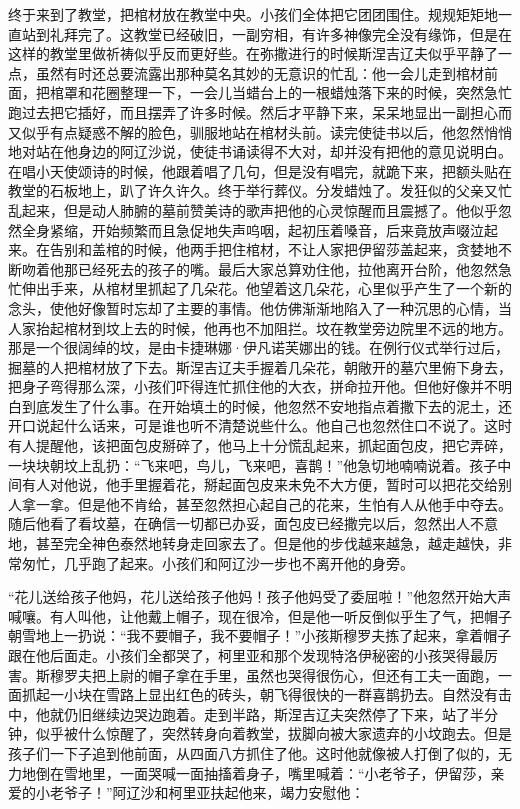 \par 终于来到了教堂，把棺材放在教堂中央。小孩们全体把它团团围住。规规矩矩地一直站到礼拜完了。这教堂已经破旧，一副穷相，有许多神像完全没有缘饰，但是在这样的教堂里做祈祷似乎反而更好些。在弥撒进行的时候斯涅吉辽夫似乎平静了一点，虽然有时还总要流露出那种莫名其妙的无意识的忙乱：他一会儿走到棺材前面，把棺罩和花圈整理一下，一会儿当蜡台上的一根蜡烛落下来的时候，突然急忙跑过去把它插好，而且摆弄了许多时候。然后才平静下来，呆呆地显出一副担心而又似乎有点疑惑不解的脸色，驯服地站在棺材头前。读完使徒书以后，他忽然悄悄地对站在他身边的阿辽沙说，使徒书诵读得不大对，却并没有把他的意见说明白。在唱小天使颂诗的时候，他跟着唱了几句，但是没有唱完，就跪下来，把额头贴在教堂的石板地上，趴了许久许久。终于举行葬仪。分发蜡烛了。发狂似的父亲又忙乱起来，但是动人肺腑的墓前赞美诗的歌声把他的心灵惊醒而且震撼了。他似乎忽然全身紧缩，开始频繁而且急促地失声呜咽，起初压着嗓音，后来竟放声啜泣起来。在告别和盖棺的时候，他两手把住棺材，不让人家把伊留莎盖起来，贪婪地不断吻着他那已经死去的孩子的嘴。最后大家总算劝住他，拉他离开台阶，他忽然急忙伸出手来，从棺材里抓起了几朵花。他望着这几朵花，心里似乎产生了一个新的念头，使他好像暂时忘却了主要的事情。他仿佛渐渐地陷入了一种沉思的心情，当人家抬起棺材到坟上去的时候，他再也不加阻拦。坟在教堂旁边院里不远的地方。那是一个很阔绰的坟，是由卡捷琳娜·伊凡诺芙娜出的钱。在例行仪式举行过后，掘墓的人把棺材放了下去。斯涅吉辽夫手握着几朵花，朝敞开的墓穴里俯下身去，把身子弯得那么深，小孩们吓得连忙抓住他的大衣，拼命拉开他。但他好像并不明白到底发生了什么事。在开始填土的时候，他忽然不安地指点着撒下去的泥土，还开口说起什么话来，可是谁也听不清楚说些什么。他自己也忽然住口不说了。这时有人提醒他，该把面包皮掰碎了，他马上十分慌乱起来，抓起面包皮，把它弄碎，一块块朝坟上乱扔：“飞来吧，鸟儿，飞来吧，喜鹊！”他急切地喃喃说着。孩子中间有人对他说，他手里握着花，掰起面包皮来未免不大方便，暂时可以把花交给别人拿一拿。但是他不肯给，甚至忽然担心起自己的花来，生怕有人从他手中夺去。随后他看了看坟墓，在确信一切都已办妥，面包皮已经撒完以后，忽然出人不意地，甚至完全神色泰然地转身走回家去了。但是他的步伐越来越急，越走越快，非常匆忙，几乎跑了起来。小孩们和阿辽沙一步也不离开他的身旁。
\par “花儿送给孩子他妈，花儿送给孩子他妈！孩子他妈受了委屈啦！”他忽然开始大声喊嚷。有人叫他，让他戴上帽子，现在很冷，但是他一听反倒似乎生了气，把帽子朝雪地上一扔说：“我不要帽子，我不要帽子！”小孩斯穆罗夫拣了起来，拿着帽子跟在他后面走。小孩们全都哭了，柯里亚和那个发现特洛伊秘密的小孩哭得最厉害。斯穆罗夫把上尉的帽子拿在手里，虽然也哭得很伤心，但还有工夫一面跑，一面抓起一小块在雪路上显出红色的砖头，朝飞得很快的一群喜鹊扔去。自然没有击中，他就仍旧继续边哭边跑着。走到半路，斯涅吉辽夫突然停了下来，站了半分钟，似乎被什么惊醒了，突然转身向着教堂，拔脚向被大家遗弃的小坟跑去。但是孩子们一下子追到他前面，从四面八方抓住了他。这时他就像被人打倒了似的，无力地倒在雪地里，一面哭喊一面抽搐着身子，嘴里喊着：“小老爷子，伊留莎，亲爱的小老爷子！”阿辽沙和柯里亚扶起他来，竭力安慰他：
